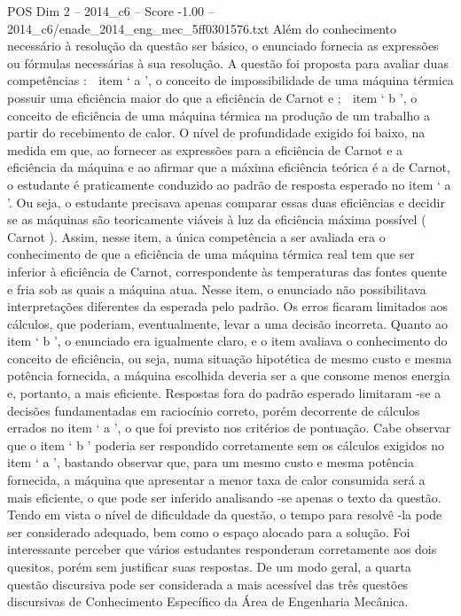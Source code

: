\begin{textsample}{POS Dim 2 – 2014\_c6 – Score -1.00 – 2014\_c6/enade\_2014\_eng\_mec\_5ff0301576.txt}
Além do conhecimento necessário à resolução da questão ser básico, o enunciado fornecia as expressões ou fórmulas necessárias à sua resolução.
A questão foi proposta para avaliar duas competências :  item ‘ a ’, o conceito de impossibilidade de uma máquina térmica possuir uma eficiência maior do que a eficiência de Carnot e ;  item ‘ b ’, o conceito de eficiência de uma máquina térmica na produção de um trabalho a partir do recebimento de calor.
O nível de profundidade exigido foi baixo, na medida em que, ao fornecer as expressões para a eficiência de Carnot e a eficiência da máquina e ao afirmar que a máxima eficiência teórica é a de Carnot, o estudante é praticamente conduzido ao padrão de resposta esperado no item ‘ a ’.
Ou seja, o estudante precisava apenas comparar essas duas eficiências e decidir se as máquinas são teoricamente viáveis à luz da eficiência máxima possível ( Carnot ).
Assim, nesse item, a única competência a ser avaliada era o conhecimento de que a eficiência de uma máquina térmica real tem que ser inferior à eficiência de Carnot, correspondente às temperaturas das fontes quente e fria sob as quais a máquina atua.
Nesse item, o enunciado não possibilitava interpretações diferentes da esperada pelo padrão.
Os erros ficaram limitados aos cálculos, que poderiam, eventualmente, levar a uma decisão incorreta.
Quanto ao item ‘ b ’, o enunciado era igualmente claro, e o item avaliava o conhecimento do conceito de eficiência, ou seja, numa situação hipotética de mesmo custo e mesma potência fornecida, a máquina escolhida deveria ser a que consome menos energia e, portanto, a mais eficiente.
Respostas fora do padrão esperado limitaram -se a decisões fundamentadas em raciocínio correto, porém decorrente de cálculos errados no item ‘ a ’, o que foi previsto nos critérios de pontuação.
Cabe observar que o item ‘ b ’ poderia ser respondido corretamente sem os cálculos exigidos no item ‘ a ’, bastando observar que, para um mesmo custo e mesma potência fornecida, a máquina que apresentar a menor taxa de calor consumida será a mais eficiente, o que pode ser inferido analisando -se apenas o texto da questão.
Tendo em vista o nível de dificuldade da questão, o tempo para resolvê -la pode ser considerado adequado, bem como o espaço alocado para a solução.
Foi interessante perceber que vários estudantes responderam corretamente aos dois quesitos, porém sem justificar suas respostas.
De um modo geral, a quarta questão discursiva pode ser considerada a mais acessível das três questões discursivas de Conhecimento Específico da Área de Engenharia Mecânica.

\end{textsample}
